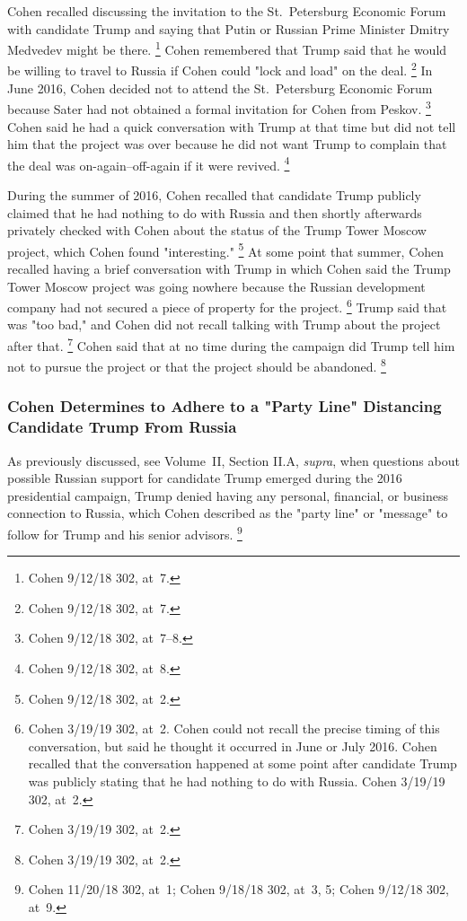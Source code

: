 Cohen recalled discussing the invitation to the St.~Petersburg Economic Forum with candidate Trump and saying that Putin or Russian Prime Minister Dmitry Medvedev might be there.%
\footnote{Cohen 9/12/18 302, at~7.}
Cohen remembered that Trump said that he would be willing to travel to Russia if Cohen could "lock and load" on the deal.%
\footnote{Cohen 9/12/18 302, at~7.}
In June 2016, Cohen decided not to attend the St.~Petersburg Economic Forum because Sater had not obtained a formal invitation for Cohen from Peskov.%
\footnote{Cohen 9/12/18 302, at~7--8.}
Cohen said he had a quick conversation with Trump at that time but did not tell him that the project was over because he did not want Trump to complain that the deal was on-again--off-again if it were revived.%
\footnote{Cohen 9/12/18 302, at~8.}

During the summer of 2016, Cohen recalled that candidate Trump publicly claimed that he had nothing to do with Russia and then shortly afterwards privately checked with Cohen about the status of the Trump Tower Moscow project, which Cohen found "interesting."%
\footnote{Cohen 9/12/18 302, at~2.}
At some point that summer, Cohen recalled having a brief conversation with Trump in which Cohen said the Trump Tower Moscow project was going nowhere because the Russian development company had not secured a piece of property for the project.%
\footnote{Cohen 3/19/19 302, at~2.
Cohen could not recall the precise timing of this conversation, but said he thought it occurred in June or July 2016.
Cohen recalled that the conversation happened at some point after candidate Trump was publicly stating that he had nothing to do with Russia.
Cohen 3/19/19 302, at~2.}
Trump said that was "too bad," and Cohen did not recall talking with Trump about the project after that.%
\footnote{Cohen 3/19/19 302, at~2.}
Cohen said that at no time during the campaign did Trump tell him not to pursue the project or that the project should be abandoned.%
\footnote{Cohen 3/19/19 302, at~2.}

\subsubsection{Cohen Determines to Adhere to a "Party Line" Distancing Candidate Trump From Russia}

As previously discussed, see Volume~II, Section II.A, \textit{supra}, when questions about possible Russian support for candidate Trump emerged during the 2016 presidential campaign, Trump denied having any personal, financial, or business connection to Russia, which Cohen described as the "party line" or "message" to follow for Trump and his senior advisors.%
\footnote{Cohen 11/20/18 302, at~1;
Cohen 9/18/18 302, at~3, 5;
Cohen 9/12/18 302, at~9.}


